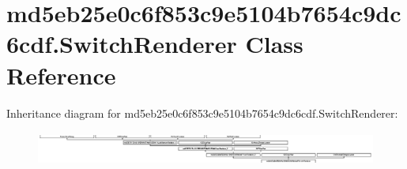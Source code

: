 \hypertarget{classmd5eb25e0c6f853c9e5104b7654c9dc6cdf_1_1SwitchRenderer}{}\section{md5eb25e0c6f853c9e5104b7654c9dc6cdf.\+Switch\+Renderer Class Reference}
\label{classmd5eb25e0c6f853c9e5104b7654c9dc6cdf_1_1SwitchRenderer}
Inheritance diagram for md5eb25e0c6f853c9e5104b7654c9dc6cdf.\+Switch\+Renderer\+:\begin{figure}[H]
\begin{center}
\leavevmode
\includegraphics[height=1.143791cm]{classmd5eb25e0c6f853c9e5104b7654c9dc6cdf_1_1SwitchRenderer}
\end{center}
\end{figure}
